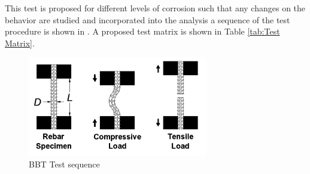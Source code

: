 This test is proposed for different levels of corrosion such that any changes on the behavior are studied and incorporated into the analysis a sequence of the test procedure is shown in . A proposed test matrix is shown in Table \ref{tab:Test Matrix}.

\begin{figure}[htbp]
	\centering
	\includegraphics[width=0.7\textwidth]{Chapter-4/figs/BBT_Sequence}
	\caption{BBT Test sequence}
	\label{fig:BBTseq}
\end{figure}

